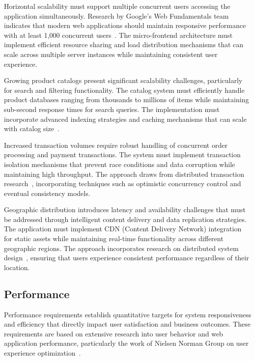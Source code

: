 \documentclass[12pt,a4paper]{report}
\begin{document}
Horizontal scalability must support multiple concurrent users accessing the application simultaneously. Research by Google's Web Fundamentals team indicates that modern web applications should maintain responsive performance with at least 1,000 concurrent users~\cite{google2021web}. The micro-frontend architecture must implement efficient resource sharing and load distribution mechanisms that can scale across multiple server instances while maintaining consistent user experience.

Growing product catalogs present significant scalability challenges, particularly for search and filtering functionality. The catalog system must efficiently handle product databases ranging from thousands to millions of items while maintaining sub-second response times for search queries. The implementation must incorporate advanced indexing strategies and caching mechanisms that can scale with catalog size~\cite{manning2008introduction}.

Increased transaction volumes require robust handling of concurrent order processing and payment transactions. The system must implement transaction isolation mechanisms that prevent race conditions and data corruption while maintaining high throughput. The approach draws from distributed transaction research~\cite{lampson1981atomic}, incorporating techniques such as optimistic concurrency control and eventual consistency models.

Geographic distribution introduces latency and availability challenges that must be addressed through intelligent content delivery and data replication strategies. The application must implement CDN (Content Delivery Network) integration for static assets while maintaining real-time functionality across different geographic regions. The approach incorporates research on distributed system design~\cite{tanenbaum2007distributed}, ensuring that users experience consistent performance regardless of their location.

\subsection{Performance}

Performance requirements establish quantitative targets for system responsiveness and efficiency that directly impact user satisfaction and business outcomes. These requirements are based on extensive research into user behavior and web application performance, particularly the work of Nielsen Norman Group on user experience optimization~\cite{nielsen2012ecommerce}.
\end{document}
